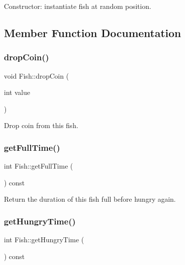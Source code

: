 Constructor\+: instantiate fish at random position. 



\subsection{Member Function Documentation}
\mbox{\label{class_fish_add7c1e5a1f01384f3e5d919d880941bd}} 
\subsubsection{\texorpdfstring{drop\+Coin()}{dropCoin()}}
{\footnotesize\ttfamily void Fish\+::drop\+Coin (\begin{DoxyParamCaption}\item[{int}]{value }\end{DoxyParamCaption})}



Drop coin from this fish. 

\mbox{\label{class_fish_aad3fb1122b2fbb928f854d73726aa234}} 
\subsubsection{\texorpdfstring{get\+Full\+Time()}{getFullTime()}}
{\footnotesize\ttfamily int Fish\+::get\+Full\+Time (\begin{DoxyParamCaption}{ }\end{DoxyParamCaption}) const}



Return the duration of this fish full before hungry again. 

\mbox{\label{class_fish_abcd4464c7dce28026fe2738b75576875}} 
\subsubsection{\texorpdfstring{get\+Hungry\+Time()}{getHungryTime()}}
{\footnotesize\ttfamily int Fish\+::get\+Hungry\+Time (\begin{DoxyParamCaption}{ }\end{DoxyParamCaption}) const}



